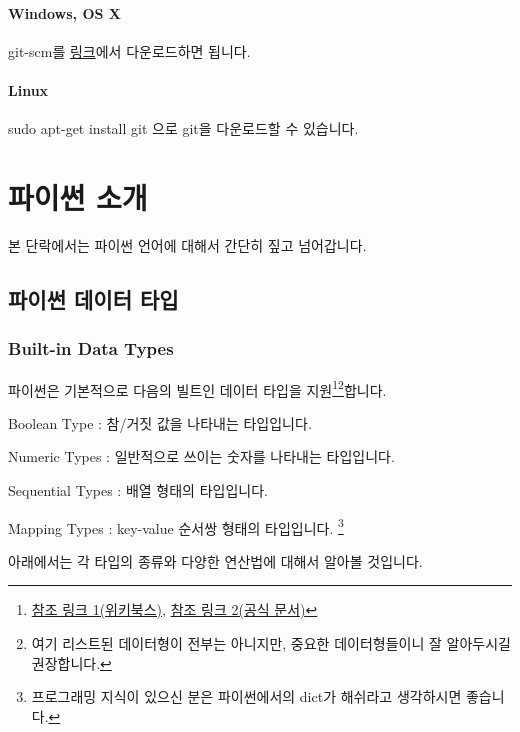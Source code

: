 \paragraph{Windows, OS X} 

git-scm를 \href{git-scm.com}{링크}에서 다운로드하면 됩니다. 

\paragraph{Linux} 

sudo apt-get install git 으로 git을 다운로드할 수 있습니다. 

\section{파이썬 소개} 





본 단락에서는 파이썬 언어에 대해서 간단히 짚고 넘어갑니다. 

\subsection{파이썬 데이터 타입} 

\subsubsection{Built-in Data Types} 
파이썬은 기본적으로 다음의 빌트인 데이터 타입을 지원\footnote{\href{https://en.wikibooks.org/wiki/Python\_Programming/Data\_Types}{참조 링크 1(위키북스)}, \href{https://docs.python.org/3/library/stdtypes.html}{참조 링크 2(공식 문서)}}\footnote{여기 리스트된 데이터형이 전부는 아니지만, 중요한 데이터형들이니 잘 알아두시길 권장합니다.}합니다. 

\begin{compactitem} 
\item Boolean Type : 참/거짓 값을 나타내는 타입입니다. 
\item Numeric Types : 일반적으로 쓰이는 숫자를 나타내는 타입입니다. 
\item Sequential Types : 배열 형태의 타입입니다. 
\item Mapping Types : key-value 순서쌍 형태의 타입입니다. \footnote{프로그래밍 지식이 있으신 분은 파이썬에서의 dict가 해쉬라고 생각하시면 좋습니다.}
\end{compactitem}

아래에서는 각 타입의 종류와 다양한 연산법에 대해서 알아볼 것입니다. 


